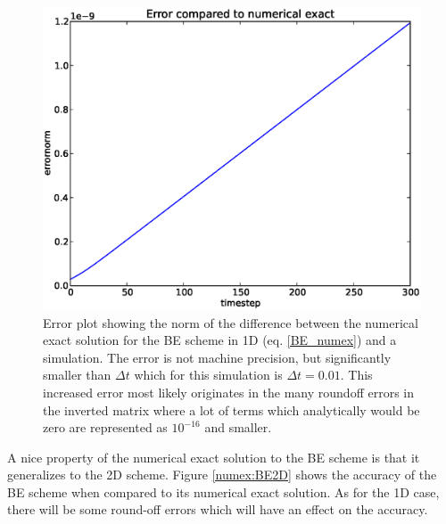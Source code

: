 \begin{figure}[H]
 \centering
 \includegraphics[scale=0.7]{../doc/results/experiment_14042014_0759_BE1D_numerical_exact/results/numerical_exact.eps}
 \caption[Numerical exact errorplot for BE scheme]{Error plot showing the norm of the difference between the numerical exact solution for the BE scheme in 1D (eq. \ref{BE_numex}) and a simulation. 
 The error is not machine precision, but significantly smaller than $\Delta t$ which for this simulation is $\Delta t=0.01$. 
 This increased error most likely originates in the many roundoff errors in the inverted matrix where a lot of terms which analytically would be zero are represented as $10^{-16}$ and smaller.}
 \label{numex:BE1D}
\end{figure}

A nice property of the numerical exact solution to the BE scheme is that it generalizes to the 2D scheme. 
Figure \ref{numex:BE2D} shows the accuracy of the BE scheme when compared to its numerical exact solution. 
As for the 1D case, there will be some round-off errors which will have an effect on the accuracy. 

